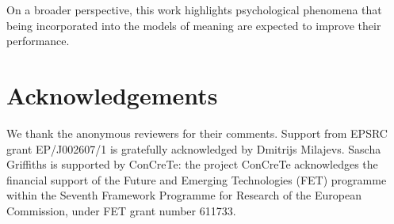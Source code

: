 \documentclass[11pt]{article}
\begin{document}
On a broader perspective, this work highlights psychological phenomena that being incorporated into the models of meaning are expected to improve their performance.

\section*{Acknowledgements}

We thank the anonymous reviewers for their comments. Support from EPSRC grant EP/J002607/1 is gratefully acknowledged by Dmitrijs Milajevs.
Sascha Griffiths is supported by ConCreTe: the project ConCreTe acknowledges the financial support of the Future and Emerging Technologies (FET) programme within the Seventh Framework Programme for Research of the European Commission, under FET grant number 611733.


\balance


\end{document}
